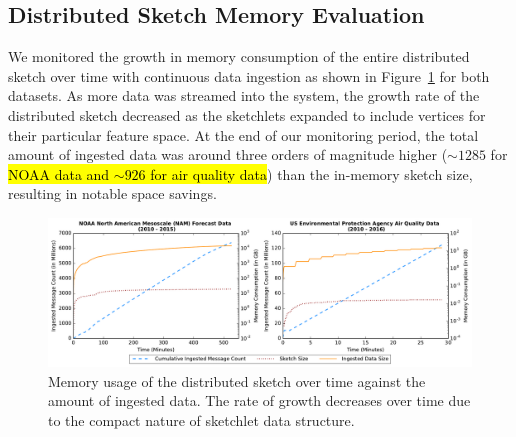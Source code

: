 \subsection{Distributed Sketch Memory Evaluation}
We monitored the growth in memory consumption of the entire distributed sketch over time with continuous data ingestion as shown in Figure~\ref{fig:dist-sketch-mem-usage} for both datasets. As more data was streamed into the system, the growth rate of the distributed sketch decreased as the sketchlets expanded to include vertices for their particular feature space.  At the end of our monitoring period, the total amount of ingested data was around three orders of magnitude higher ($\sim 1285$ for \hl{NOAA data and $\sim 926$ for air quality data}) than the in-memory sketch size, resulting in notable space savings.
%
%
\begin{figure}[t!]
    \centerline{\includegraphics[width=\linewidth]{figures/ing-and-mem-usage-noaa-airquality.pdf}}
    \caption{Memory usage of the distributed sketch over time against the amount of ingested data. The rate of growth decreases over time due to the compact nature of sketchlet data structure.}
    \label{fig:dist-sketch-mem-usage}
\end{figure}
%
